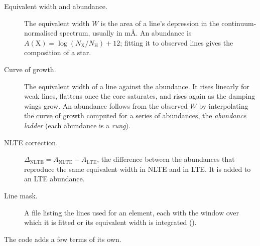 \documentclass[paper=a4, fontsize=10pt]{scrartcl}
\numberwithin{equation}{section}		%
\numberwithin{figure}{section}			%
\numberwithin{table}{section}				%
\newcommand{\filecolor}{\color{NavyBlue}}
\newcommand{\brk}[1]{\leavevmode\begingroup\ttfamily
  \def\_{\textunderscore\allowbreak}%
  \StrSubstitute{#1}{/}{/\allowbreak}[\brkA]%
  \StrSubstitute{\brkA}{.}{.\allowbreak}[\brkA]%
  \StrSubstitute{\brkA}{-}{-{}}[\brkA]%
  \brkA\endgroup}
\newcommand{\File}[1]{\leavevmode{\filecolor\brk{#1}}}
\begin{document}
\begin{description}
    \item[Equivalent width and abundance.] The equivalent width $W$ is the area of a line's depression in the continuum-normalised spectrum, usually in m\AA. An abundance is $A(\mathrm{X})=\log(N_\mathrm{X}/N_\mathrm{H})+12$; fitting it to observed lines gives the composition of a star.
    \item[Curve of growth.] The equivalent width of a line against the abundance. It rises linearly for weak lines, flattens once the core saturates, and rises again as the damping wings grow. An abundance follows from the observed $W$ by interpolating the curve of growth computed for a series of abundances, the \emph{abundance ladder} (each abundance is a \emph{rung}).
    \item[NLTE correction.] $\Delta_\mathrm{NLTE}=A_\mathrm{NLTE}-A_\mathrm{LTE}$, the difference between the abundances that reproduce the same equivalent width in NLTE and in LTE. It is added to an LTE abundance.
    \item[Line mask.] A file listing the lines used for an element, each with the window over which it is fitted or its equivalent width is integrated (\File{input/linemasks/}).
\end{description}

The code adds a few terms of its own.
\end{document}
